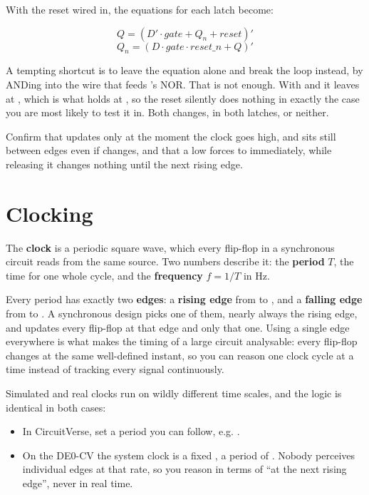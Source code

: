 With the reset wired in, the equations for each latch become:

\[ Q = (D' \cdot \mathit{gate} + Q_n + \mathit{reset})' \]
\[ Q_n = (D \cdot \mathit{gate} \cdot \mathit{reset\_n} + Q)' \]

A tempting shortcut is to leave the  equation alone and break the loop instead, by ANDing
 into the  wire that feeds 's NOR. That is not enough. With
 and  it leaves  at , which is what holds  at
, so the reset silently does nothing in exactly the case you are most likely to test it in.
Both changes, in both latches, or neither.

Confirm that  updates only at the moment the clock goes high, and sits still between edges
even if  changes, and that a low  forces  to  immediately,
while releasing it changes nothing until the next rising edge.

\section{Clocking}
\label{c3:sec:clock}

The \textbf{clock} is a periodic square wave, which every flip-flop in a synchronous circuit reads
from the same source. Two numbers describe it: the \textbf{period} $T$, the time for one whole
cycle, and the \textbf{frequency} $f = 1/T$ in Hz.

Every period has exactly two \textbf{edges}: a \textbf{rising edge} from  to , and
a \textbf{falling edge} from  to . A synchronous design picks one of them, nearly
always the rising edge, and updates every flip-flop at that edge and only that one. Using a single
edge everywhere is what makes the timing of a large circuit analysable: every flip-flop changes at
the same well-defined instant, so you can reason one clock cycle at a time instead of tracking every
signal continuously.

Simulated and real clocks run on wildly different time scales, and the logic is identical in both
cases:
\begin{itemize}
  \item In CircuitVerse, set a period you can follow, e.g. .
  \item On the DE0-CV the system clock is a fixed , a period of . Nobody
    perceives individual edges at that rate, so you reason in terms of ``at the next rising edge'',
    never in real time.
\end{itemize}

